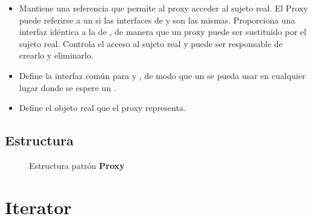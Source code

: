 \begin{itemize}
\item \Proxy Mantiene una referencia que permite al proxy acceder al sujeto real. El Proxy puede referirse a un \Sujeto si las interfaces de \SujetoReal y \Sujeto son las mismas.
Proporciona una interfaz idéntica a la de \Sujeto, de manera que un proxy puede ser sustituido por el sujeto real.
Controla el acceso al sujeto real y puede ser responsable de crearlo y eliminarlo.

\item \Sujeto Define la interfaz común para \SujetoReal y \Proxy, de modo que un \Proxy se pueda usar en cualquier lugar donde se espere un \SujetoReal.

\item \SujetoReal Define el objeto real que el proxy representa.

\end{itemize}


\subsection*{Estructura}


\begin{figure}[H]
\caption{Estructura patrón \textbf{Proxy}}
\begin{center}
\end{center}
\end{figure}




\section{Iterator}
\label{patronIterator}

